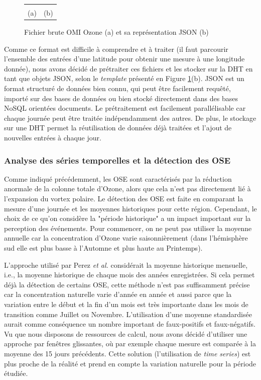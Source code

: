 \begin{figure}
	\centering
	\begin{tabular}{cc}
		\imagetop{\TOMS}&\imagetop{\JSON}\\
		{\small (a)}&{\small (b)}
	\end{tabular}
	\caption{Fichier brute OMI Ozone (a) et sa représentation JSON (b)}\label{fig:toms}
	
\end{figure}

Comme ce format est difficile à comprendre et à traiter (il faut parcourir l'ensemble des entrées d'une latitude pour obtenir une mesure à une longitude donnée), nous avons décidé de prétraiter ces fichiers et les stocker sur la DHT en tant que objets JSON, selon le \textit{template} présenté en Figure \ref{fig:toms}(b). JSON est un format structuré de données bien connu, qui peut être facilement requêté, importé sur des bases de données ou bien stocké directement dans des bases NoSQL orientées  documents. Le prétraitement est facilement parallélisable car chaque journée peut être traitée indépendamment des autres. De plus, le stockage sur une DHT permet la réutilisation de données déjà traitées et l'ajout de nouvelles entrées à chaque jour. 

\subsubsection*{Analyse des séries temporelles et la détection des OSE\label{sec:timeseries}}

Comme indiqué précédemment, les OSE sont caractérisés par la réduction anormale de la colonne totale d'Ozone, alors que cela n'est pas directement lié à l'expansion du vortex polaire. Le détection des OSE est faite en comparant la mesure d'une journée et les moyennes historiques pour cette région. Cependant, le choix de ce qu'on considère la "période historique" a un impact important sur la perception des événements. Pour commencer, on ne peut pas utiliser la moyenne annuelle car la concentration d'Ozone varie saisonnièrement (dans l'hémisphère sud elle est plus basse à l'Automne et plus haute au Printemps). 

L'approche utilisé par Perez \textit{et al. }\cite{Peres2013} considérait la moyenne historique mensuelle, i.e., la moyenne historique de chaque mois des années enregistrées. Si cela permet déjà la détection de certains OSE, cette méthode n'est pas suffisamment précise car la concentration naturelle varie d'année en année et aussi parce que la variation entre le début et la fin d'un mois est très importante dans les mois de transition comme Juillet ou Novembre. L'utilisation d'une moyenne standardisée aurait comme conséquence un nombre important de faux-positifs et faux-négatifs. Vu que nous disposons de ressources de calcul, nous avons décidé d'utiliser une approche par fenêtres glissantes, où par exemple chaque mesure est comparée à la moyenne des 15 jours précédents. Cette solution (l'utilisation de \textit{time series}) est plus proche de la réalité et prend en compte la variation naturelle pour la période étudiée.


